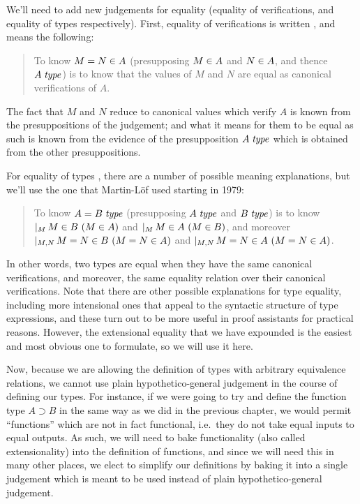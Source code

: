\documentclass[main.tex]{subfiles}
\begin{document}
We'll need to add new judgements for equality (equality of
verifications, and equality of types respectively). First, equality of
verifications is written , and means the
following:

\begin{quote}
  To know $M=N\in A$ (presupposing $M\in A$ and $N\in A$,
  and thence $A\;\mathit{type}$) is to know that the values of $M$ and $N$ are
  equal as canonical verifications of $A$.
\end{quote}

The fact that $M$ and $N$ reduce to canonical values which verify $A$
is known from the presuppositions of the judgement; and what it means
for them to be equal as such is known from the evidence of the
presupposition $A\;\mathit{type}$ which is obtained from the other
presuppositions.

For equality of types , there are a number of
possible meaning explanations, but we'll use the one that Martin-L\"of
used starting in 1979:

\begin{quote}
  To know $A=B\;\mathit{type}$ (presupposing $A\;\mathit{type}$ and $B\;\mathit{type}$) is to know
$\lvert_{M}\,M\in B\ (M\in A)$ and
$\lvert_{M}\,M\in A\ (M\in B)$, and moreover
$\lvert_{M,N}\,M=N\in B\ (M=N\in A)$ and
$\lvert_{M,N}\,M=N\in A\ (M=N\in A)$.
\end{quote}

In other words, two types are equal when they have the same canonical
verifications, and moreover, the same equality relation over their canonical
verifications. Note that there are other possible explanations for type
equality, including more intensional ones that appeal to the syntactic
structure of type expressions, and these turn out to be more useful in proof
assistants for practical reasons. However, the extensional equality that we
have expounded is the easiest and most obvious one to formulate, so we will
use it here.

Now, because we are allowing the definition of types with arbitrary equivalence
relations, we cannot use plain hypothetico-general judgement in the course of
defining our types. For instance, if we were going to try and define the
function type $A\supset B$ in the same way as we did in the previous chapter,
we would permit ``functions'' which are not in fact functional, i.e.\ they do
not take equal inputs to equal outputs. As such, we will need to bake
functionality (also called extensionality) into the definition of functions,
and since we will need this in many other places, we elect to simplify our
definitions by baking it into a single judgement which is meant to be used
instead of plain hypothetico-general judgement.
\end{document}

